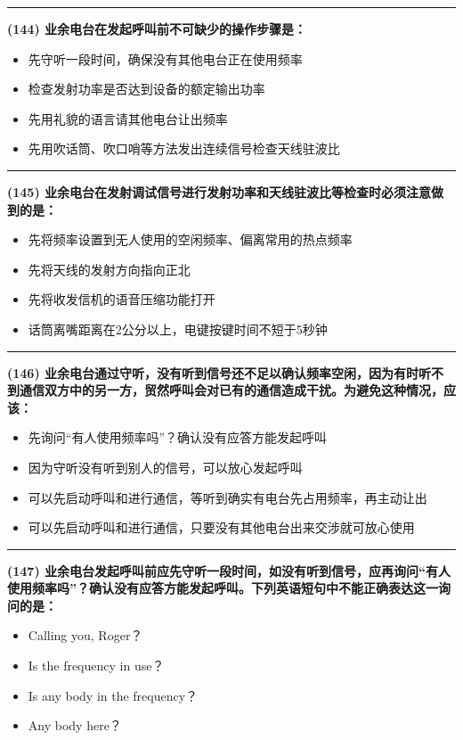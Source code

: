 \documentclass[twocolumn]{ctexart}  %
\begin{document}
\noindent\rule{0.5\textwidth}{1pt}
\heiti \textbf{(144) 业余电台在发起呼叫前不可缺少的操作步骤是：} \songti {\color{gray} [LK0232] }
\begin{itemize}
	\item  先守听一段时间，确保没有其他电台正在使用频率
	\item  检查发射功率是否达到设备的额定输出功率
	\item  先用礼貌的语言请其他电台让出频率
	\item  先用吹话筒、吹口哨等方法发出连续信号检查天线驻波比
\end{itemize}


\noindent\rule{0.5\textwidth}{1pt}
\heiti \textbf{(145) 业余电台在发射调试信号进行发射功率和天线驻波比等检查时必须注意做到的是：} \songti {\color{gray} [LK0233] }
\begin{itemize}
	\item  先将频率设置到无人使用的空闲频率、偏离常用的热点频率
	\item  先将天线的发射方向指向正北
	\item  先将收发信机的语音压缩功能打开
	\item  话筒离嘴距离在2公分以上，电键按键时间不短于5秒钟
\end{itemize}


\noindent\rule{0.5\textwidth}{1pt}
\heiti \textbf{(146) 业余电台通过守听，没有听到信号还不足以确认频率空闲，因为有时听不到通信双方中的另一方，贸然呼叫会对已有的通信造成干扰。为避免这种情况，应该：} \songti {\color{gray} [LK0235] }
\begin{itemize}
	\item  先询问“有人使用频率吗”？确认没有应答方能发起呼叫
	\item  因为守听没有听到别人的信号，可以放心发起呼叫
	\item  可以先启动呼叫和进行通信，等听到确实有电台先占用频率，再主动让出
	\item  可以先启动呼叫和进行通信，只要没有其他电台出来交涉就可放心使用
\end{itemize}


\noindent\rule{0.5\textwidth}{1pt}
\heiti \textbf{(147) 业余电台发起呼叫前应先守听一段时间，如没有听到信号，应再询问“有人使用频率吗”？确认没有应答方能发起呼叫。下列英语短句中不能正确表达这一询问的是：} \songti {\color{gray} [LK0236] }
\begin{itemize}
	\item  Calling you, Roger？
	\item  Is the frequency in use？
	\item  Is any body in the frequency？
	\item  Any body here？
\end{itemize}
\end{document}
